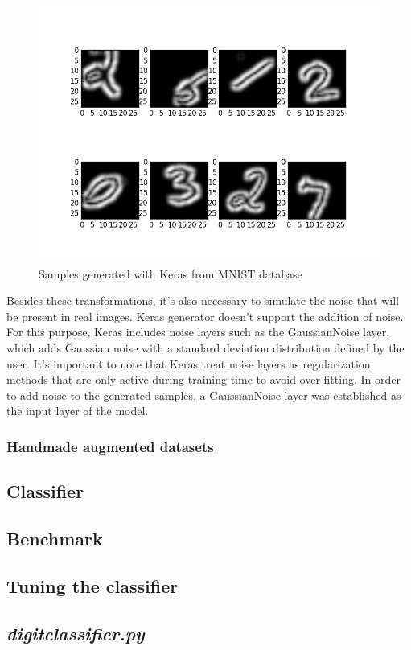 \begin{figure}
	\centering
	\includegraphics[width=12cm, keepaspectratio]{figures/aug_keras.png}
	\caption{Samples generated with Keras from MNIST database}
	\label{fig:aug_keras}
\end{figure}

Besides these transformations, it's also necessary to simulate the noise that will be present in real images. Keras generator doesn't support the addition of noise. For this purpose, Keras includes noise layers such as the GaussianNoise layer, which adds Gaussian noise with a standard deviation distribution defined by the user. It's important to note that Keras treat noise layers as regularization methods that are only active during training time to avoid over-fitting. In order to add noise to the generated samples, a GaussianNoise layer was established as the input layer of the model.
\subsubsection{Handmade augmented datasets}
\subsection{Classifier}\label{subsec:classifier}
\subsection{Benchmark}\label{subsec:bencharmk}
\subsection{Tuning the classifier}\label{subsec:tuning}
\subsection{\textit{digitclassifier.py}}\label{subsec:digitclassifier.py}
